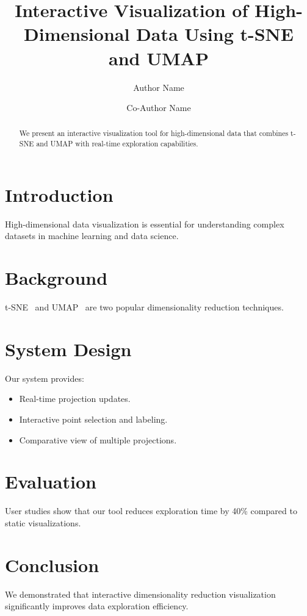 \documentclass[sigconf,review]{acmart}
\begin{document}
\title{Interactive Visualization of High-Dimensional Data
       Using t-SNE and UMAP}

\author{Author Name}

\author{Co-Author Name}

\begin{abstract}
We present an interactive visualization tool for
high-dimensional data that combines t-SNE and UMAP
with real-time exploration capabilities.
\end{abstract}



\maketitle

\section{Introduction}
High-dimensional data visualization is essential for
understanding complex datasets in machine learning and
data science.

\section{Background}
t-SNE~\cite{maaten2008} and UMAP~\cite{mcinnes2018} are
two popular dimensionality reduction techniques.

\section{System Design}
Our system provides:
\begin{itemize}
\item Real-time projection updates.
\item Interactive point selection and labeling.
\item Comparative view of multiple projections.
\end{itemize}

\section{Evaluation}
User studies show that our tool reduces exploration
time by 40\% compared to static visualizations.

\section{Conclusion}
We demonstrated that interactive dimensionality
reduction visualization significantly improves
data exploration efficiency.



\end{document}
